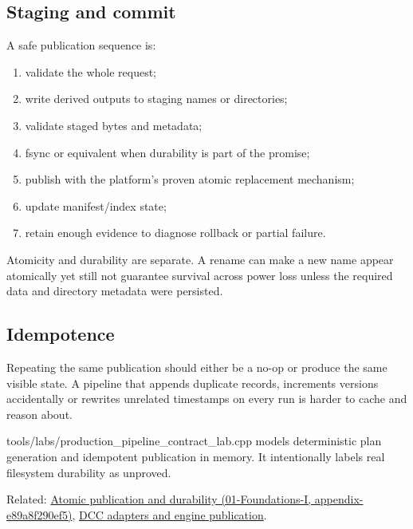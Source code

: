 \subsection{Staging and commit}\label{appendix-91eaa3cbdbc3-staging-and-commit}

A safe publication sequence is:

\begin{enumerate}
\def\labelenumi{\arabic{enumi}.}
\tightlist
\item
  validate the whole request;
\item
  write derived outputs to staging names or directories;
\item
  validate staged bytes and metadata;
\item
  fsync or equivalent when durability is part of the promise;
\item
  publish with the platform's proven atomic replacement mechanism;
\item
  update manifest/index state;
\item
  retain enough evidence to diagnose rollback or partial failure.
\end{enumerate}

Atomicity and durability are separate. A rename can make a new name appear atomically yet still not guarantee survival across power loss unless the required data and directory metadata were persisted.

\subsection{Idempotence}\label{appendix-91eaa3cbdbc3-idempotence}

Repeating the same publication should either be a no-op or produce the same visible state. A pipeline that appends duplicate records, increments versions accidentally or rewrites unrelated timestamps on every run is harder to cache and reason about.

tools/labs/production\_pipeline\_contract\_lab.cpp models deterministic plan generation and idempotent publication in memory. It intentionally labels real filesystem durability as unproved.

Related: \href{../01-Foundations-I/main.pdf\#nameddest=appendix-e89a8f290ef5}{Atomic publication and durability (01-Foundations-I, appendix-e89a8f290ef5)}, \hyperref[appendix-03ade9e1875f]{DCC adapters and engine publication}.
